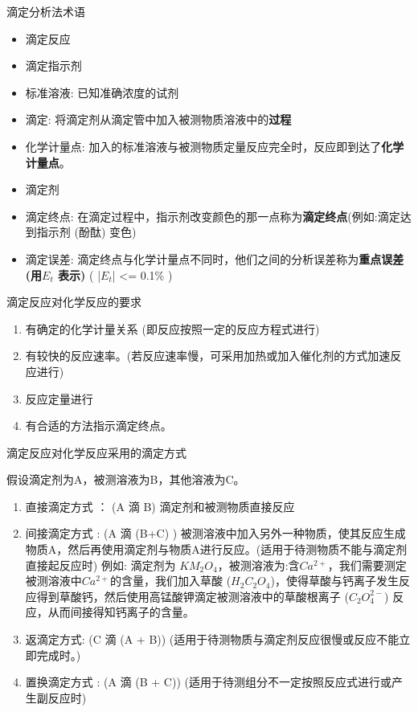 滴定分析法术语
\begin{itemize}
	\item 滴定反应
	\item 滴定指示剂
	\item 标准溶液: 已知准确浓度的试剂
	\item 滴定: 将滴定剂从滴定管中加入被测物质溶液中的\textbf{过程}
	\item 化学计量点: 加入的标准溶液与被测物质定量反应完全时，反应即到达了\textbf{化学计量点}。 
	\item 滴定剂
	\item 滴定终点: 在滴定过程中，指示剂改变颜色的那一点称为\textbf{滴定终点}(例如:滴定达到指示剂 (酚酞) 变色)
	\item 滴定误差: 滴定终点与化学计量点不同时，他们之间的分析误差称为\textbf{重点误差 (用$E_t$ 表示)} ( |$E_t$| <= 0.1\% )
	
\end{itemize}


滴定反应对化学反应的要求
\begin{enumerate}
	\item 有确定的化学计量关系 (即反应按照一定的反应方程式进行)
	\item 有较快的反应速率。(若反应速率慢，可采用加热或加入催化剂的方式加速反应进行)
	\item 反应定量进行
	\item 有合适的方法指示滴定终点。
	
\end{enumerate}

滴定反应对化学反应采用的滴定方式 

假设滴定剂为A，被测溶液为B，其他溶液为C。
\begin{enumerate}
	\item 直接滴定方式 ： (A 滴 B) 滴定剂和被测物质直接反应

	\item 间接滴定方式 : (A 滴 (B+C) ) 被测溶液中加入另外一种物质，使其反应生成物质A，然后再使用滴定剂与物质A进行反应。(适用于待测物质不能与滴定剂直接起反应时)
	例如: 滴定剂为 $KM_2O_4$，被测溶液为:含$Ca^{2+}$，我们需要测定被测溶液中$Ca^{2+}$的含量，我们加入草酸 ($H_2C_2O_4$)，使得草酸与钙离子发生反应得到草酸钙，然后使用高锰酸钾滴定被测溶液中的草酸根离子 ($C_2O_4^{2-}$) 反应，从而间接得知钙离子的含量。

	\item 返滴定方式: (C 滴 (A + B)) (适用于待测物质与滴定剂反应很慢或反应不能立即完成时。) 

	\item 置换滴定方式 : (A 滴 (B + C)) (适用于待测组分不一定按照反应式进行或产生副反应时)
	
\end{enumerate}


